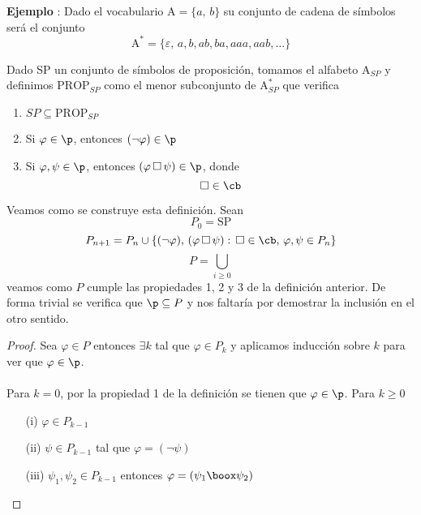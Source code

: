 \addtocounter{ej}{1} %
\textbf{Ejemplo }: Dado el vocabulario $\mbox{A}=\{ a, \,b \}$ su conjunto de cadena de símbolos será el conjunto 
\[ \mbox{A}^*= \{\varepsilon, \, a, b, ab, ba, aaa, aab, \ldots \} \]
\begin{definition} Dado SP un conjunto de símbolos de proposición, tomamos el alfabeto $\mbox{A}_{SP}$ y definimos $\mbox{PROP}_{SP}$ como el menor subconjunto de $\mbox{A}^*_{SP}$ que verifica 
\begin{enumerate}
	\item $SP \subseteq \mbox{PROP}_{SP}$
	\item Si $\varphi \in \p$, entonces $(\lnot \varphi) \in \p$
	\item Si $\varphi, \psi \in \p$, entonces $(\varphi \, \Box \, \psi) \in \p$, donde \[ \Box \in \cb \] 
\end{enumerate}
\end{definition}
Veamos como se construye esta definición. Sean 
\[ P_0 = \mbox{SP} \]
\[ P_{n+1}= P_n \cup \{(\lnot \varphi), \, (\varphi \, \Box \, \psi) : \, \Box \in \cb, \, \varphi, \psi \in P_n \} \]
\[ P= \bigcup_{i \geq 0} \]
veamos como $P$ cumple las propiedades 1, 2 y 3 de la definición anterior. De forma trivial se verifica que $\p \subseteq P$ y nos faltaría por demostrar la inclusión en el otro sentido. 
\begin{proof}
Sea $\varphi \in P$ entonces $\exists k$ tal que $\varphi \in P_k$ y aplicamos inducción sobre $k$ para ver que $\varphi \in \p$. 
\paragraph{}
Para $k=0$, por la propiedad 1 de la definición se tienen que $\varphi \in \p$. Para $k \geq 0$ 
\begin{itemize}
	\item[(i)] $\varphi \in P_{k-1}$
	\item[(ii)] $\psi \in P_{k-1}$ tal que $\varphi = (\lnot \psi)$
	\item[(iii)] $\psi_1, \psi_2 \in P_{k-1}$ entonces $\varphi = (\psi_1 \boox \psi_2)$
\end{itemize}
\end{proof}